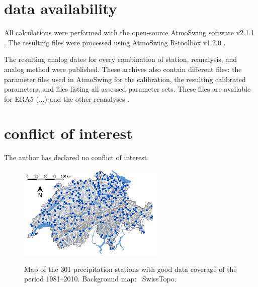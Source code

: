 \documentclass[alpha-refs]{wiley-article}
\begin{document}
\section*{data availability}
All calculations were performed with the open-source AtmoSwing software v2.1.1 \citep{Horton2019c}. The resulting files were processed using AtmoSwing R-toolbox v1.2.0 \citep{Horton2018d}.

The resulting analog dates for every combination of station, reanalysis, and analog method were published. These archives also contain different files: the parameter files used in AtmoSwing for the calibration, the resulting calibrated parameters, and files listing all assessed parameter sets. These files are available for ERA5 (...) and the other reanalyses \citep[see references in][]{Horton2018b}.



\section*{conflict of interest}
The author has declared no conflict of interest.




\linespread{1}






\begin{figure}
	\includegraphics[width=70mm]{figures/map-stations.jpg}\\
	\caption{Map of the 301 precipitation stations with good data coverage of the period 1981--2010. Background map: \textcopyright\ SwissTopo.}
	\label{fig:stations}
\end{figure}
\end{document}
